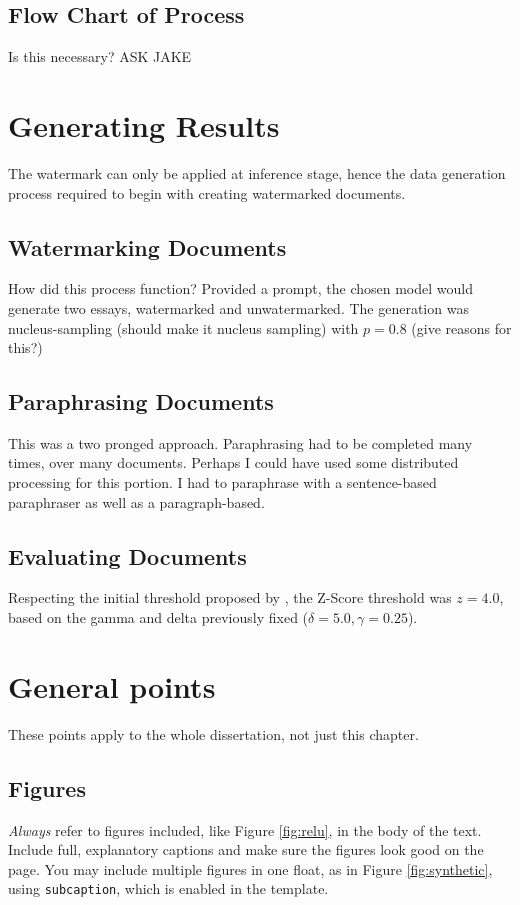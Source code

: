 \documentclass{l4proj}
\theoremstyle{definition}
\begin{document}
    \subsection{Flow Chart of Process}
        Is this necessary? ASK JAKE 
        
\section{Generating Results} %
    The watermark can only be applied at inference stage, hence the data generation process required to begin with creating watermarked documents. 

    \subsection{Watermarking Documents}
        How did this process function? Provided a prompt, the chosen model would generate two essays, watermarked and unwatermarked. The generation was nucleus-sampling (should make it nucleus sampling) with $p = 0.8$ (give reasons for this?)

    \subsection{Paraphrasing Documents}
        This was a two pronged approach. Paraphrasing had to be completed many times, over many documents. Perhaps I could have used some distributed processing for this portion. 
        I had to paraphrase with a sentence-based paraphraser as well as a paragraph-based.

    \subsection{Evaluating Documents}
        Respecting the initial threshold proposed by \citet{kirchenbauer2023watermark}, the Z-Score threshold was $z = 4.0$, based on the gamma and delta previously fixed ($\delta = 5.0, \gamma = 0.25$). 

\section{General points}

These points apply to the whole dissertation, not just this chapter.



\subsection{Figures}
\emph{Always} refer to figures included, like Figure \ref{fig:relu}, in the body of the text. Include full, explanatory captions and make sure the figures look good on the page.
You may include multiple figures in one float, as in Figure \ref{fig:synthetic}, using \texttt{subcaption}, which is enabled in the template.
\end{document}
